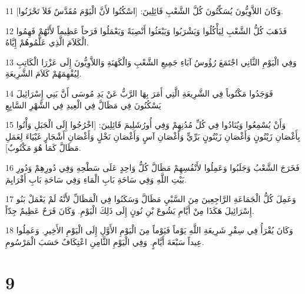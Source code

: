 \par 11 وَكَانَ اللاَّوِيُّونَ يُسَكِّتُونَ كُلَّ الشَّعْبِ قَائِلِينَ: [اسْكُتُوا لأَنَّ الْيَوْمَ مُقَدَّسٌ فَلاَ تَحْزَنُوا].
\par 12 فَذَهَبَ كُلُّ الشَّعْبِ لِيَأْكُلُوا وَيَشْرَبُوا وَيَبْعَثُوا أَنْصِبَةً وَيَعْمَلُوا فَرَحاً عَظِيماً لأَنَّهُمْ فَهِمُوا الْكَلاَمَ الَّذِي عَلَّمُوهُمْ إِيَّاهُ.
\par 13 وَفِي الْيَوْمِ الثَّانِي اجْتَمَعَ رُؤُوسُ آبَاءِ جَمِيعِ الشَّعْبِ وَالْكَهَنَةِ وَاللاَّوِيُّونَ إِلَى عَزْرَا الْكَاتِبِ لِيُفْهِمَهُمْ كَلاَمَ الشَّرِيعَةِ.
\par 14 فَوَجَدُوا مَكْتُوباً فِي الشَّرِيعَةِ الَّتِي أَمَرَ بِهَا الرَّبُّ عَنْ يَدِ مُوسَى أَنَّ بَنِي إِسْرَائِيلَ يَسْكُنُونَ فِي مَظَالَّ فِي الْعِيدِ فِي الشَّهْرِ السَّابِعِ
\par 15 وَأَنْ يُسْمِعُوا وَيُنَادُوا فِي كُلِّ مُدُنِهِمْ وَفِي أُورُشَلِيمَ قَائِلِينَ: [اخْرُجُوا إِلَى الْجَبَلِ وَأْتُوا بِأَغْصَانِ زَيْتُونٍ وَأَغْصَانِ زَيْتُونٍ بَرِّيٍّ وَأَغْصَانِ آسٍ وَأَغْصَانِ نَخْلٍ وَأَغْصَانِ أَشْجَارٍ غَبْيَاءَ لِعَمَلِ مَظَالَّ كَمَا هُوَ مَكْتُوبٌ].
\par 16 فَخَرَجَ الشَّعْبُ وَجَلَبُوا وَعَمِلُوا لأَنْفُسِهِمْ مَظَالَّ كُلُّ وَاحِدٍ عَلَى سَطْحِهِ وَفِي دُورِهِمْ وَدُورِ بَيْتِ اللَّهِ وَفِي سَاحَةِ بَابِ الْمَاءِ وَفِي سَاحَةِ بَابِ أَفْرَايِمَ.
\par 17 وَعَمِلَ كُلُّ الْجَمَاعَةِ الرَّاجِعِينَ مِنَ السَّبْيِ مَظَالَّ وَسَكَنُوا فِي الْمَظَالِّ لأَنَّهُ لَمْ يَعْمَلْ بَنُو إِسْرَائِيلَ هَكَذَا مِنْ أَيَّامِ يَشُوعَ بْنِ نُونٍ إِلَى ذَلِكَ الْيَوْمِ. وَكَانَ فَرَحٌ عَظِيمٌ جِدّاً.
\par 18 وَكَانَ يُقْرَأُ فِي سِفْرِ شَرِيعَةِ اللَّهِ يَوْماً فَيَوْماً مِنَ الْيَوْمِ الأَوَّلِ إِلَى الْيَوْمِ الأَخِيرِ. وَعَمِلُوا عِيداً سَبْعَةَ أَيَّامٍ. وَفِي الْيَوْمِ الثَّامِنِ اعْتِكَافٌ حَسَبَ الْمَرْسُومِ.

\chapter{9}

